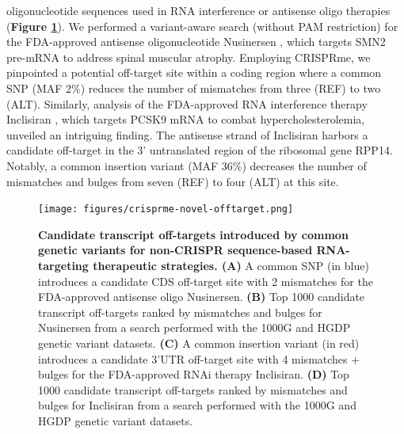 \documentclass[a4paper, titlepage, openright]{book}
\begin{document}
oligonucleotide sequences used in RNA interference or antisense oligo therapies (\textbf{Figure \ref{fig:crisprme-novel-off-target}}). We performed a variant-aware search (without PAM restriction) for the FDA-approved antisense oligonucleotide Nusinersen \citep{finkel2017nusinersen,mercuri2018nusinersen}, which targets SMN2 pre-mRNA to address spinal muscular atrophy. Employing CRISPRme, we pinpointed a potential off-target site within a coding region where a common SNP (MAF 2\%) reduces the number of mismatches from three (REF) to two (ALT). Similarly, analysis of the FDA-approved RNA interference therapy Inclisiran \citep{raal2020inclisiran}, which targets PCSK9 mRNA to combat hypercholesterolemia, unveiled an intriguing finding. The antisense strand of Inclisiran harbors a candidate off-target in the 3' untranslated region of the ribosomal gene RPP14. Notably, a common insertion variant (MAF 36\%) decreases the number of mismatches and bulges from seven (REF) to four (ALT) at this site. 

\begin{figure}[!]
	\centering
	\texttt{[image: figures/crisprme-novel-offtarget.png]}
	\caption[Candidate transcript off-targets introduced by common genetic variants for non-CRISPR sequence-based RNA-targeting therapeutic strategies]{\textbf{Candidate transcript off-targets introduced by common genetic variants for non-CRISPR sequence-based RNA-targeting therapeutic strategies. (A)} A common SNP (in blue) introduces a candidate CDS off-target site with 2 mismatches for the FDA-approved antisense oligo Nusinersen. \textbf{(B)} Top 1000 candidate transcript off-targets ranked by mismatches and bulges for Nusinersen from a search performed with the 1000G and HGDP genetic variant datasets. \textbf{(C)} A common insertion variant (in red) introduces a candidate 3’UTR off-target site with 4 mismatches + bulges for the FDA-approved RNAi therapy Inclisiran. \textbf{(D)} Top 1000 candidate transcript off-targets ranked by mismatches and bulges for Inclisiran from a search performed with the 1000G and HGDP genetic variant datasets.}
	\label{fig:crisprme-novel-off-target}
\end{figure} 

\end{document}
